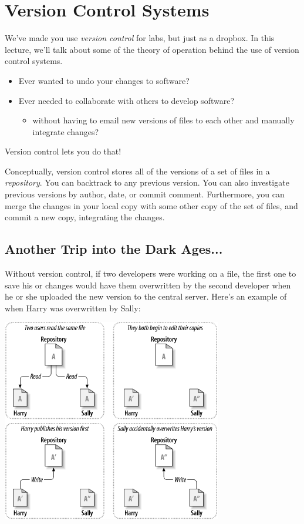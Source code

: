




\section*{Version Control Systems}
We've made you use \emph{version control} for labs,
but just as a dropbox.  In this lecture, we'll talk about some of the
theory of operation behind the use of version control systems.

\begin{itemize}
\item Ever wanted to undo
your changes to software? 
\item Ever needed to collaborate with others to develop software?
\begin{itemize}
\item without
having to email new versions of files to each other and manually integrate
changes?
\end{itemize}
\end{itemize}
Version control lets you do that!

Conceptually, version control stores all of the versions of a set of
files in a \emph{repository}. You can backtrack to any previous
version. You can also investigate previous versions by author, date,
or commit comment. Furthermore, you can merge the changes in your
local copy with some other copy of the set of files, and commit a new
copy, integrating the changes.

\subsection*{Another Trip into the Dark Ages...}

Without version control, if two developers were working on a file, the first one to save his or changes would have them overwritten by the second developer when he or she uploaded the new version to the central server. Here's an example of when Harry was overwritten by Sally:

\begin{center}
	\includegraphics[width=.5\textwidth]{images/ch02dia2.png}
	~\cite{svnbook}
\end{center}

